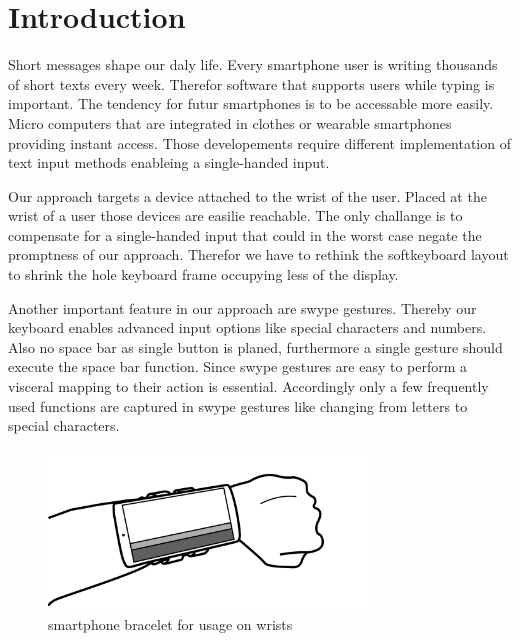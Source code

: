 \documentclass{acm_proc_article-sp}
\begin{document}

\section{Introduction}
Short messages shape our daly life. Every smartphone user is writing thousands of short texts every week. Therefor software that supports users while typing is important. The tendency for futur smartphones is to be accessable more easily. Micro computers that are integrated in clothes or wearable smartphones providing instant access. Those developements require different implementation of text input methods enableing a single-handed input.

Our approach targets a device attached to the wrist of the user. Placed at the wrist of a user those devices are easilie reachable. The only challange is to compensate for a single-handed input that could in the worst case negate the promptness of our approach. Therefor we have to rethink the softkeyboard layout to shrink the hole keyboard frame occupying less of the display.

Another important feature in our approach are swype gestures. Thereby our keyboard enables advanced input options like special characters and numbers. Also no space bar as single button is planed, furthermore a single gesture should execute the space bar function. Since swype gestures are easy to perform a visceral mapping to their action is essential. Accordingly only a few frequently used functions are captured in swype gestures like changing from letters to special characters. 
\begin{figure}[htb]
  \begin{center}
    \includegraphics[width=85mm]{demo.png}
    \caption{smartphone bracelet for usage on wrists}
    \label{detection}
  \end{center}
\end{figure}
\end{document}
